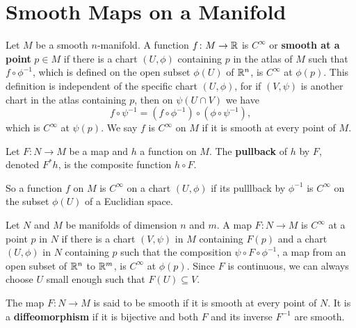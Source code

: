 \section{Smooth Maps on a Manifold}
\begin{definition}[]
    Let $M$ be a smooth $n$-manifold. A function $f \colon M \to \mathbb{R}$ is $C^{\infty}$ or \textbf{smooth at a point} $p \in M$ if there is a chart $(U, \phi)$ containing $p$ in the atlas of $M$ such that $f \circ \phi ^{-1}$, which is defined on the open subset $\phi (U) $ of $\mathbb{R}^n $, is $C^{\infty}$ at $\phi(p)$. This definition is independent of the specific chart $(U, \phi)$, for if $(V, \psi)$ is another chart in the atlas containing $p$, then on $\psi (U \cap V)$ we have \[
        f \circ\psi ^{-1}  = (f \circ  \phi ^{-1}) \circ (\phi \circ \psi ^{-1}),
    \] which is $C^{\infty}$ at $\psi (p)$. We say $f$ is $C^{\infty}$ on $M$ if it is smooth at every point of $M$.
\end{definition}
\begin{definition}[]
    Let $F \colon N \to M$ be a map and $h$ a function on $M$. The \textbf{pullback} of $h$ by $F$, denoted $F^* h$, is the composite function $h \circ F$.
\end{definition}
So a function $f$ on $M$ is $C^{\infty}$ on a chart $(U, \phi)$ if its pulllback by $\phi ^{-1}$ is $C^{\infty}$ on the subset $\phi (U)$ of a Euclidian space.

\begin{definition}[]
    Let $N$ and $M$ be manifolds of dimension $n$ and $m$. A map $F \colon N \to M$ is $C^{\infty}$ at a point $p$ in $N$ if there is a chart  $(V,\psi)$ in $M$ containing $F(p)$ and a chart $(U,\phi)$ in $N$ containing $p$ such that the composition $\psi \circ F \circ \phi ^{-1}$, a map from an open subset of $\mathbb{R}^n $ to $\mathbb{R}^m$, is $C^{\infty}$ at $\phi (p)$. Since $F$ is continuous, we can always choose $U$ small enough such that $F(U) \subseteq V$.
\end{definition}
\begin{definition}[]
    The map $F \colon N \to M$ is said to be smooth if it is smooth at every point of $N$. It is a \textbf{diffeomorphism} if it is bijective and both $F$ and its inverse $F^{-1}$ are smooth.
\end{definition}
